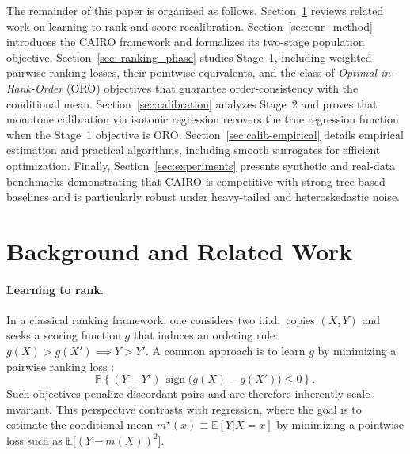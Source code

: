 \documentclass[11pt]{article}
\theoremstyle{plain}
\theoremstyle{plain}
\theoremstyle{plain}
\theoremstyle{plain}
\theoremstyle{plain}
\theoremstyle{plain}
\theoremstyle{plain}
\begin{document}
The remainder of this paper is organized as follows. Section~\ref{sec:background} reviews related work on learning-to-rank and score recalibration. Section~\ref{sec:our_method} introduces the \textsc{CAIRO} framework and formalizes its two-stage population objective. Section~\ref{sec: ranking_phase} studies Stage~1, including weighted pairwise ranking losses, their pointwise equivalents, and the class of \emph{Optimal-in-Rank-Order} (ORO) objectives that guarantee order-consistency with the conditional mean. Section~\ref{sec:calibration} analyzes Stage~2 and proves that monotone calibration via isotonic regression recovers the true regression function when the Stage~1 objective is ORO. Section~\ref{sec:calib-empirical} details empirical estimation and practical algorithms, including smooth surrogates for efficient optimization. Finally, Section~\ref{sec:experiments} presents synthetic and real-data benchmarks demonstrating that \textsc{CAIRO} is competitive with strong tree-based baselines and is particularly robust under heavy-tailed and heteroskedastic noise.


\section{Background and Related Work}
\label{sec:background}

 
\paragraph{Learning to rank.}

In a classical ranking framework, one considers two i.i.d.\ copies $(X,Y)$ and seeks a scoring function $g$ that induces an ordering rule: $g(X)>g(X') \implies Y>Y'$. A common approach is to learn $g$ by minimizing a pairwise ranking loss \citep{clemenccon2008ranking}:
\begin{equation}
\label{eq:01-pop}
\mathbb{P}\!\left\{(Y-Y')\,\operatorname{sign}\!\big(g(X)-g(X')\big)\le 0\right\},
\end{equation}
Such objectives penalize discordant pairs and are therefore inherently scale-invariant. This perspective contrasts with regression, where the goal is to estimate the conditional mean
$m^\star(x) \equiv \mathbb{E}[Y| X=x]$ by minimizing a pointwise loss such as $\mathbb{E}\big[(Y-m(X))^2\big]$.
\end{document}
